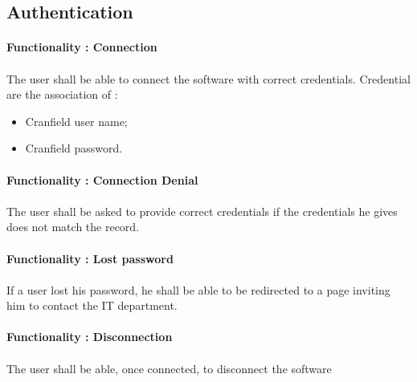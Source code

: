 


\subsection{Authentication}
 \paragraph{Functionality  : Connection}\paragraph{}
 The user shall be able to connect the software with correct credentials. Credential are the association of : 
 \begin{itemize}
 	\item Cranfield user name;
 	\item Cranfield password.
 \end{itemize}
 
 
 
 \paragraph{Functionality  : Connection Denial}\paragraph{}
 The user shall be asked to provide correct credentials if the credentials he gives does not match the record.


  \paragraph{Functionality  : Lost password}\paragraph{}
  If a user lost his password, he shall be able to be redirected to a page inviting him to contact the IT department. 
 
  \paragraph{Functionality  : Disconnection}\paragraph{}
  The user shall be able, once connected, to disconnect the software
  
